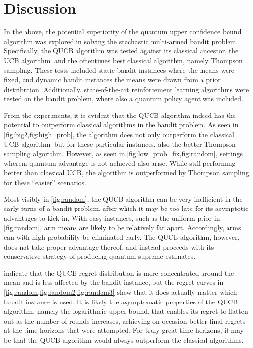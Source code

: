 \section{Discussion}
In the above, the potential superiority of the quantum upper confidence bound algorithm was explored in solving the stochastic multi-armed bandit problem.
Specifically, the QUCB algorithm was tested against its classical ancestor, the UCB algorithm, and the oftentimes best classical algorithm, namely Thompson sampling.
These tests included static bandit instances where the means were fixed, and dynamic bandit instances the means were drawn from a prior distribution.
Additionally, state-of-the-art reinforcement learning algorithms were tested on the bandit problem, where also a quantum policy agent was included.

From the experiments, it is evident that the QUCB algorithm indeed has the potential to outperform classical algorithms in the bandit problem.
As seen in \cref{fig:big2,fig:high_prob}, the algorithm does not only outperform the classical UCB algorithm, but for these particular instances, also the better Thompson sampling algorithm.
However, as seen in \cref{fig:low_prob_fix,fig:random}, settings wherein quantum advantage is not achieved also arise.
While still performing better than classical UCB, the algorithm is outperformed by Thompson sampling for these \enquote{easier} scenarios.

Most visibly in \cref{fig:random}, the QUCB algorithm can be very inefficient in the early turns of a bandit problem, after which it may be too late for its asymptotic advantages to kick in.
With easy instances, such as the uniform prior in \cref{fig:random}, arm means are likely to be relatively far apart.
Accordingly, arms can with high probability be eliminated early.
The QUCB algorithm, however, does not take proper advantage thereof, and instead proceeds with its conservative strategy of producing quantum supreme estimates.

 indicate that the QUCB regret distribution is more concentrated around the mean and is less affected by the bandit instance, but the regret curves in \cref{fig:random,fig:random2,fig:random3} show that it does actually matter which bandit instance is used.
It is likely the asymptomatic properties of the QUCB algorithm, namely the logarithmic upper bound, that enables its regret to flatten out as the number of rounds increases, achieving on occasion better final regrets at the time horizons that were attempted.
For truly great time horizons, it may be that the QUCB algorithm would always outperform the classical algorithms.

